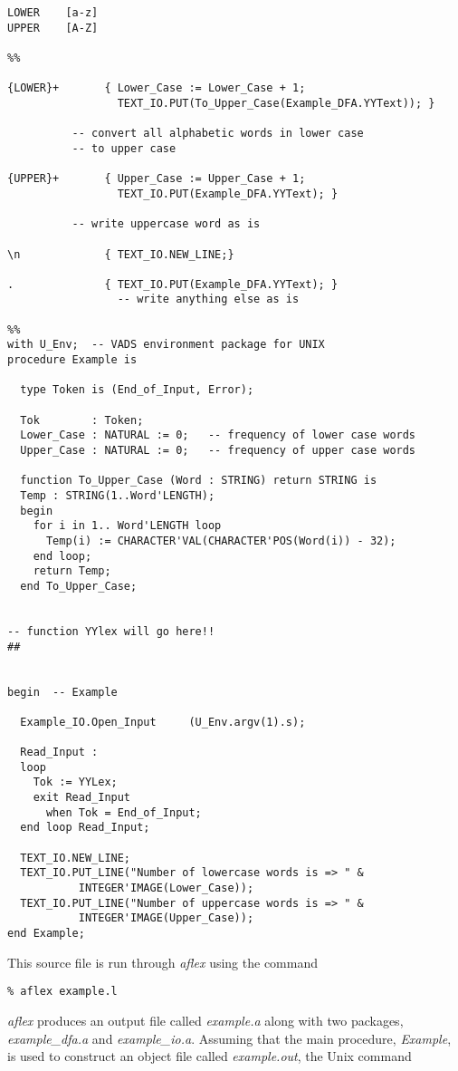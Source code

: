 \small
\begin{verbatim}
LOWER    [a-z]
UPPER    [A-Z]

%%

{LOWER}+       { Lower_Case := Lower_Case + 1; 
                 TEXT_IO.PUT(To_Upper_Case(Example_DFA.YYText)); }

		  -- convert all alphabetic words in lower case
		  -- to upper case

{UPPER}+       { Upper_Case := Upper_Case + 1;
                 TEXT_IO.PUT(Example_DFA.YYText); }

		  -- write uppercase word as is

\n             { TEXT_IO.NEW_LINE;}

.              { TEXT_IO.PUT(Example_DFA.YYText); }
                 -- write anything else as is

%%
with U_Env;  -- VADS environment package for UNIX
procedure Example is

  type Token is (End_of_Input, Error);

  Tok        : Token;
  Lower_Case : NATURAL := 0;   -- frequency of lower case words
  Upper_Case : NATURAL := 0;   -- frequency of upper case words

  function To_Upper_Case (Word : STRING) return STRING is
  Temp : STRING(1..Word'LENGTH);
  begin
    for i in 1.. Word'LENGTH loop
      Temp(i) := CHARACTER'VAL(CHARACTER'POS(Word(i)) - 32); 
    end loop;
    return Temp;
  end To_Upper_Case;
  

-- function YYlex will go here!!
##


begin  -- Example

  Example_IO.Open_Input     (U_Env.argv(1).s);

  Read_Input :
  loop
    Tok := YYLex;
    exit Read_Input
      when Tok = End_of_Input;
  end loop Read_Input;

  TEXT_IO.NEW_LINE;
  TEXT_IO.PUT_LINE("Number of lowercase words is => " & 
		   INTEGER'IMAGE(Lower_Case));
  TEXT_IO.PUT_LINE("Number of uppercase words is => " & 
		   INTEGER'IMAGE(Upper_Case));
end Example;
\end{verbatim}
\normalsize

This source file is run through {\sl aflex} using the command

\small
\begin{verbatim}
% aflex example.l
\end{verbatim}
\normalsize
   
{\sl aflex} produces an output file called {\it example.a}
along with two packages, {\it example\_dfa.a} and {\it example\_io.a}.
Assuming that the main procedure, {\sl Example}, is used to construct
an object file called {\it example.out}, the Unix command

